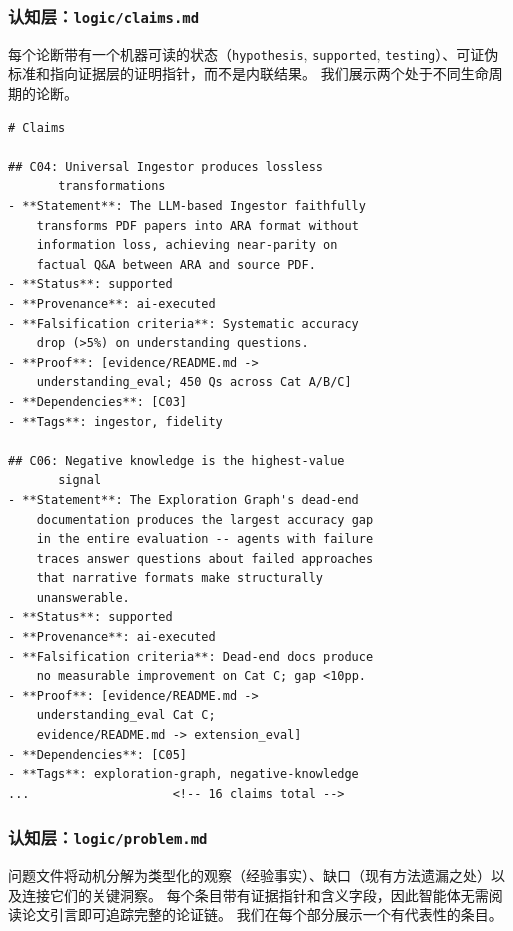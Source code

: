 \documentclass[
]{article}
\newcommand{\passthrough}[1]{#1}
\theoremstyle{definition}
\begin{document}
\subsubsection{\texorpdfstring{认知层：\texttt{logic/claims.md}}{认知层：logic/claims.md}}\label{ux8ba4ux77e5ux5c42logicclaims.md}

每个论断带有一个机器可读的状态（\passthrough{\lstinline!hypothesis!},
\passthrough{\lstinline!supported!},
\passthrough{\lstinline!testing!}）、可证伪标准和指向证据层的证明指针，而不是内联结果。
我们展示两个处于不同生命周期的论断。

\begin{lstlisting}
# Claims

## C04: Universal Ingestor produces lossless
       transformations
- **Statement**: The LLM-based Ingestor faithfully
    transforms PDF papers into ARA format without
    information loss, achieving near-parity on
    factual Q&A between ARA and source PDF.
- **Status**: supported
- **Provenance**: ai-executed
- **Falsification criteria**: Systematic accuracy
    drop (>5%) on understanding questions.
- **Proof**: [evidence/README.md ->
    understanding_eval; 450 Qs across Cat A/B/C]
- **Dependencies**: [C03]
- **Tags**: ingestor, fidelity

## C06: Negative knowledge is the highest-value
       signal
- **Statement**: The Exploration Graph's dead-end
    documentation produces the largest accuracy gap
    in the entire evaluation -- agents with failure
    traces answer questions about failed approaches
    that narrative formats make structurally
    unanswerable.
- **Status**: supported
- **Provenance**: ai-executed
- **Falsification criteria**: Dead-end docs produce
    no measurable improvement on Cat C; gap <10pp.
- **Proof**: [evidence/README.md ->
    understanding_eval Cat C;
    evidence/README.md -> extension_eval]
- **Dependencies**: [C05]
- **Tags**: exploration-graph, negative-knowledge
...                    <!-- 16 claims total -->
\end{lstlisting}

\subsubsection{\texorpdfstring{认知层：\texttt{logic/problem.md}}{认知层：logic/problem.md}}\label{ux8ba4ux77e5ux5c42logicproblem.md}

问题文件将动机分解为类型化的观察（经验事实）、缺口（现有方法遗漏之处）以及连接它们的关键洞察。
每个条目带有证据指针和含义字段，因此智能体无需阅读论文引言即可追踪完整的论证链。
我们在每个部分展示一个有代表性的条目。
\end{document}

